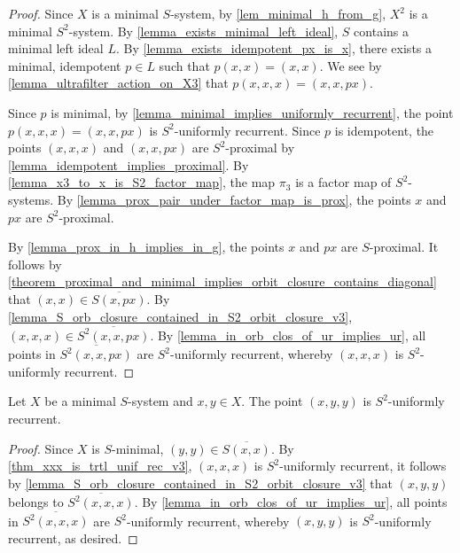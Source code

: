 \begin{proof}
    \leanok{}
Since $X$ is a minimal $S$-system, by \cref{lem_minimal_h_from_g}, $X^2$ is a minimal $S^2$-system.  By \cref{lemma_exists_minimal_left_ideal}, $S$ contains a minimal left ideal $L$. By \cref{lemma_exists_idempotent_px_is_x}, there exists a minimal, idempotent $p \in L$ such that $p(x,x) = (x,x)$.  We see by \cref{lemma_ultrafilter_action_on_X3} that $p(x,x,x) = (x,x,p x)$.

Since $p$ is minimal, by \cref{lemma_minimal_implies_uniformly_recurrent}, the point $p(x,x,x) = (x,x,px)$ is $S^2$-uniformly recurrent.  Since $p$ is idempotent, the points $(x,x,x)$ and $(x,x,px)$ are $S^2$-proximal by \cref{lemma_idempotent_implies_proximal}.  By \cref{lemma_x3_to_x_is_S2_factor_map}, the map $\pi_3$ is a factor map of $S^2$-systems.  By \cref{lemma_prox_pair_under_factor_map_is_prox}, the points $x$ and $px$ are $S^2$-proximal.

By \cref{lemma_prox_in_h_implies_in_g}, the points $x$ and $px$ are $S$-proximal.  It follows by \cref{theorem_proximal_and_minimal_implies_orbit_closure_contains_diagonal} that $(x,x) \in \overline{S(x,px)}$. By \cref{lemma_S_orb_closure_contained_in_S2_orbit_closure_v3}, $(x,x,x) \in \overline{S^2(x,x,px)}$.  By \cref{lemma_in_orb_clos_of_ur_implies_ur}, all points in $\overline{S^2(x,x,px)}$ are $S^2$-uniformly recurrent, whereby $(x,x,x)$ is $S^2$-uniformly recurrent.
\end{proof}

\begin{theorem}
\label{thm_xyy_is_trtl_unif_rec_v3}
\leanok{}
    Let $X$ be a minimal $S$-system and $x, y \in X$.  The point $(x,y,y)$ is $S^2$-uniformly recurrent.
\end{theorem}

\begin{proof}
\leanok{}
Since $X$ is $S$-minimal, $(y,y) \in \overline{S(x,x)}$. By \cref{thm_xxx_is_trtl_unif_rec_v3}, $(x,x,x)$ is $S^2$-uniformly recurrent, it follows by \cref{lemma_S_orb_closure_contained_in_S2_orbit_closure_v3} that $(x,y,y)$ belongs to $\overline{S^2(x,x,x)}$. By \cref{lemma_in_orb_clos_of_ur_implies_ur}, all points in $\overline{S^2(x,x,x)}$ are $S^2$-uniformly recurrent, whereby $(x,y,y)$ is $S^2$-uniformly recurrent, as desired.
\end{proof}


